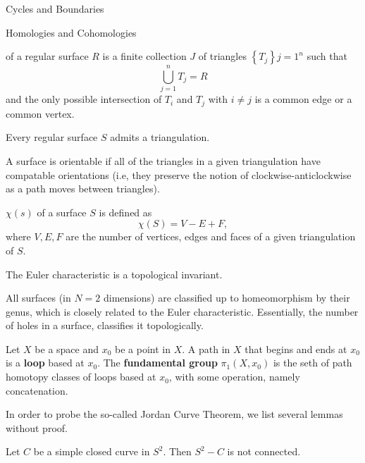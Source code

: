 \begin{subsubsection}{Cycles and Boundaries}
\begin{subsubsection}{Homologies and Cohomologies}
\begin{definition}[A triangulation] of a regular surface $R$ is a finite 
  collection $J$ of triangles $\left\{T_j\right\}j=1^n$ such that
  \begin{equation}
    \bigcup^n_{j=1}T_j = R
  \end{equation}
  and the only possible intersection of $T_i$ and $T_j$ with $i\neq j$ is a
  common edge or a common vertex.
\end{definition}
\begin{proposition}
  Every regular surface $S$ admits a triangulation.
\end{proposition}
\begin{definition}
  A surface is orientable if all of the triangles in a given triangulation have 
  compatable orientations (i.e, they preserve the notion of
  clockwise-anticlockwise as a path moves between triangles).
\end{definition}
\begin{definition} $\chi(s)$ of a surface $S$ is defined
  as
  \begin{equation}
    \chi(S) = V-E+F,
  \end{equation}
where $V,E,F$ are the number of vertices, edges and faces of a given
triangulation of $S$.
\end{definition}
\begin{proposition}
  The Euler characteristic is a topological invariant.
\end{proposition}
\begin{remark}
  All surfaces (in $N=2$ dimensions) are classified up to homeomorphism by
  their genus, which is closely related to the Euler characteristic.
  Essentially, the number of holes in a surface, classifies it topologically.
\end{remark}
\begin{definition}
  Let $X$ be a space and $x_0$ be a point in $X$. A path in $X$ that begins and
  ends at $x_0$ is a \textbf{loop} based at $x_0$. The \textbf{fundamental group}
  $\pi_1(X,x_0)$ is the seth of path homotopy classes of loops based at $x_0$,
  with some operation, namely concatenation.
\end{definition}
In order to probe the so-called Jordan Curve Theorem, we list several lemmas
without proof.
\begin{proposition}
  Let $C$ be a simple closed curve in $S^2$. Then $S^2-C$ is not connected.
\end{proposition}

\end{subsubsection}
\end{subsubsection}
